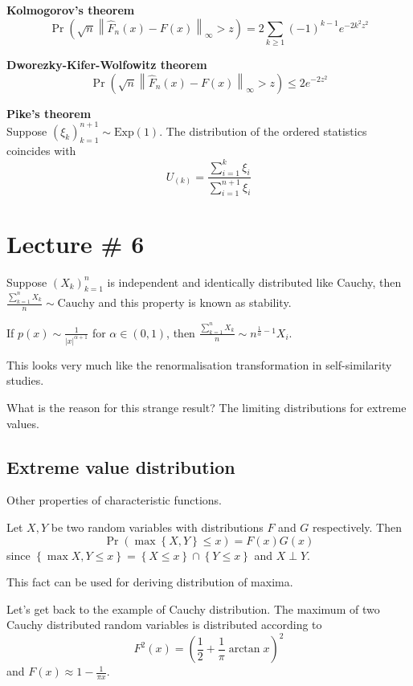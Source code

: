 \documentclass[a4paper]{article}
\newcommand{\obj}[1]{{\left\{ #1 \right \}}}
\newcommand{\brac}[1]{{\left ( #1 \right )}}
\newcommand{\abs}[1]{{\left | #1 \right |}}
\newcommand{\nrm}[1]{{\left\| #1 \right \|}}
\begin{document}
\noindent\textbf{Kolmogorov's theorem}\hfill\\
\[\Pr\brac{\sqrt{n}\nrm{\hat{F}_n(x) - F(x)}_\infty>z} = 2\sum_{k\geq1} {(-1)}^{k-1} e^{-2k^2z^2}\]

\noindent\textbf{Dworezky-Kifer-Wolfowitz theorem}\hfill\\
\[\Pr\brac{\sqrt{n}\nrm{\hat{F}_n(x) - F(x)}_\infty>z} \leq 2 e^{-2z^2}\]

\noindent\textbf{Pike's theorem}\hfill\\
Suppose $\brac{\xi_k}_{k=1}^{n+1}\sim \text{Exp}(1)$.
The distribution of the ordered statistics coincides with 
\[U_{(k)} = \frac{\sum_{i=1}^k\xi_i}{\sum_{i=1}^{n+1}\xi_i}\]



\section{Lecture \# 6} %
\label{sec:lecture_6}

Suppose $\brac{X_k}_{k=1}^n$ is independent and identically distributed like Cauchy, then $\frac{\sum_{k=1}^n X_k}{n}\sim \text{Cauchy}$ and this property is known as stability.

If $p(x)\sim \frac{1}{\abs{x}^{\alpha+1}}$ for $\alpha\in\brac{0,1}$, then $\frac{\sum_{k=1}^n X_k}{n}\sim n^{\frac{1}{\alpha}-1} X_i$.

This looks very much like the renormalisation transformation in self-similarity studies.

What is the reason for this strange result? The limiting distributions for extreme values.

\subsection{Extreme value distribution} %
\label{sub:extreme_value_distribution}

Other properties of characteristic functions.

Let $X,Y$ be two random variables with distributions $F$ and $G$ respectively. Then \[\Pr\brac{\max\obj{X,Y}\leq x} = F(x)G(x)\]
since $\obj{\max{X,Y}\leq x} = \obj{X\leq x}\cap \obj{Y\leq x}$ and $X\perp Y$.

This fact can be used for deriving distribution of maxima.

Let's get back to the example of Cauchy distribution. The maximum of two Cauchy distributed random variables is distributed according to
\[F^2(x) = \brac{\frac{1}{2} + \frac{1}{\pi}\arctan x}^2\]
and $F(x)\approx 1 - \frac{1}{\pi x}$.
\end{document}

